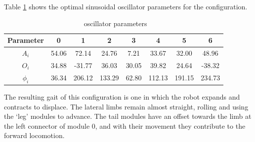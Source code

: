 Table \ref{table:robot_7_parameters} shows the optimal sinusoidal oscillator parameters for the \robotSeven configuration.\\

\begin{table}[H]
\centering
\begin{tabular}{|c||c|c|c|c|c|c|c|} \hline
Parameter & 0 & 1 & 2 & 3 & 4 & 5 & 6 \\ \hline
\hline $A_i$ & 54.06 & 72.14 & 24.76 & 7.21 & 33.67 & 32.00 & 48.96 \\ 
\hline $O_i$ & 34.88 & -31.77 & 36.03 & 30.05 & 39.82 & 24.64 & -38.32 \\ 
\hline $\phi_i$ & 36.34 & 206.12 & 133.29 & 62.80 & 112.13 & 191.15 & 234.73 \\ 
\hline 
\end{tabular}
\caption{\robotSeven ~oscillator parameters}
\label{table:robot_7_parameters}
\end{table}

The resulting gait of this configuration is one in which the robot expands and contracts to displace. The lateral limbs remain almost straight, rolling and using the `leg' modules to advance. The tail modules have an offset towards the limb at the left connector of module 0, and with their movement they contribute to the forward locomotion.\\

